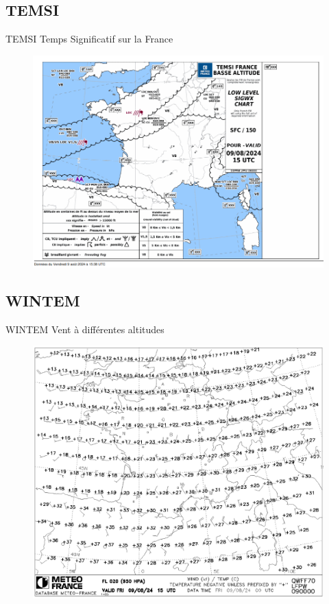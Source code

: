 \documentclass{beamer}
\begin{document}
\subsection{TEMSI}
\begin{frame}{TEMSI}
  Temps Significatif sur la France
  \pause
  \begin{figure}
    \centering
    \includegraphics[scale=0.9]{images/temsi.png}
  \end{figure}
\end{frame}

\subsection{WINTEM}
\begin{frame}{WINTEM}
  Vent à différentes altitudes
  \pause
  \begin{figure}
    \centering
    \includegraphics[scale=0.7]{images/wintem.png}
  \end{figure}
\end{frame}
\end{document}
